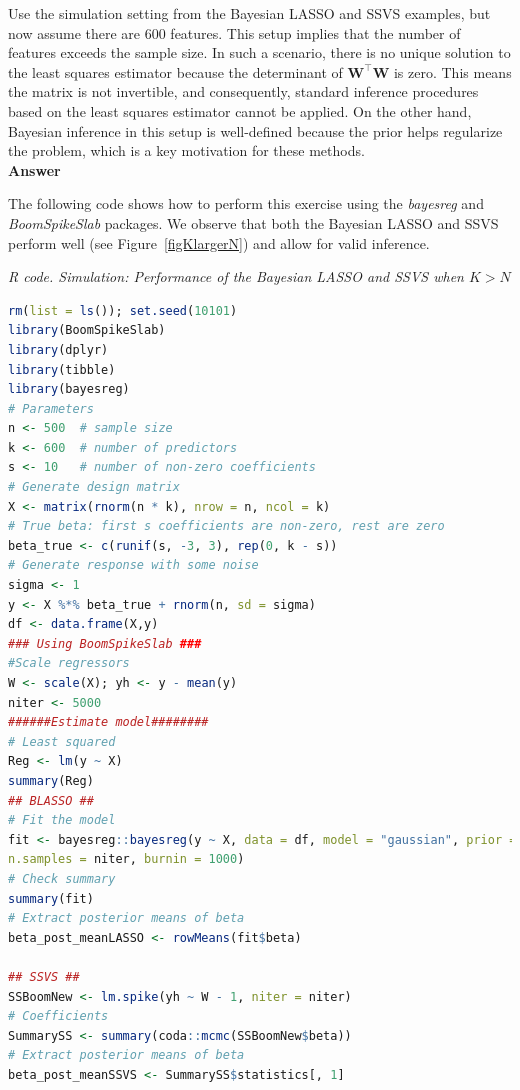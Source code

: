 \begin{enumerate}[leftmargin=*]
Use the simulation setting from the Bayesian LASSO and SSVS examples, but now assume there are 600 features. This setup implies that the number of features exceeds the sample size. In such a scenario, there is no unique solution to the least squares estimator because the determinant of $\mathbf{W}^{\top} \mathbf{W}$ is zero. This means the matrix is not invertible, and consequently, standard inference procedures based on the least squares estimator cannot be applied. On the other hand, Bayesian inference in this setup is well-defined because the prior helps regularize the problem, which is a key motivation for these methods.\\

\textbf{Answer}

The following code shows how to perform this exercise using the \textit{bayesreg} and \textit{BoomSpikeSlab} packages. We observe that both the Bayesian LASSO and SSVS perform well (see Figure~\ref{figKlargerN}) and allow for valid inference.

\begin{tcolorbox}[enhanced,width=4.67in,center upper,
	fontupper=\large\bfseries,drop shadow southwest,sharp corners]
	\textit{R code. Simulation: Performance of the Bayesian LASSO and SSVS when $K > N$}
	\begin{VF}
		\begin{lstlisting}[language=R]
rm(list = ls()); set.seed(10101)
library(BoomSpikeSlab)
library(dplyr)
library(tibble)
library(bayesreg)
# Parameters
n <- 500  # sample size
k <- 600  # number of predictors
s <- 10   # number of non-zero coefficients
# Generate design matrix
X <- matrix(rnorm(n * k), nrow = n, ncol = k)
# True beta: first s coefficients are non-zero, rest are zero
beta_true <- c(runif(s, -3, 3), rep(0, k - s))
# Generate response with some noise
sigma <- 1
y <- X %*% beta_true + rnorm(n, sd = sigma)
df <- data.frame(X,y)
### Using BoomSpikeSlab ###
#Scale regressors
W <- scale(X); yh <- y - mean(y)
niter <- 5000
######Estimate model########
# Least squared
Reg <- lm(y ~ X)
summary(Reg)
## BLASSO ##
# Fit the model
fit <- bayesreg::bayesreg(y ~ X, data = df, model = "gaussian", prior = "lasso", 
n.samples = niter, burnin = 1000)
# Check summary
summary(fit)
# Extract posterior means of beta
beta_post_meanLASSO <- rowMeans(fit$beta)

## SSVS ##
SSBoomNew <- lm.spike(yh ~ W - 1, niter = niter)
# Coefficients
SummarySS <- summary(coda::mcmc(SSBoomNew$beta))
# Extract posterior means of beta
beta_post_meanSSVS <- SummarySS$statistics[, 1]


\end{lstlisting}
\end{VF}
\end{tcolorbox}
\end{enumerate}
